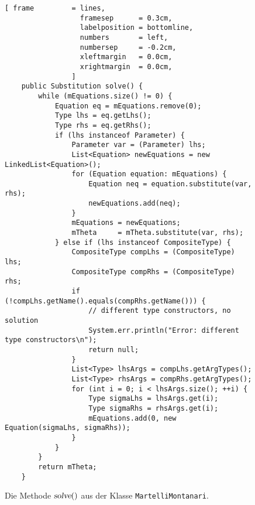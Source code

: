 \begin{figure}[!ht]
\centering
\begin{Verbatim}[ frame         = lines, 
                  framesep      = 0.3cm, 
                  labelposition = bottomline,
                  numbers       = left,
                  numbersep     = -0.2cm,
                  xleftmargin   = 0.0cm,
                  xrightmargin  = 0.0cm,
                ]
    public Substitution solve() {
        while (mEquations.size() != 0) {
            Equation eq = mEquations.remove(0);
            Type lhs = eq.getLhs();
            Type rhs = eq.getRhs();
            if (lhs instanceof Parameter) {
                Parameter var = (Parameter) lhs;
                List<Equation> newEquations = new LinkedList<Equation>();
                for (Equation equation: mEquations) {
                    Equation neq = equation.substitute(var, rhs);
                    newEquations.add(neq);
                }
                mEquations = newEquations;
                mTheta     = mTheta.substitute(var, rhs);
            } else if (lhs instanceof CompositeType) {
                CompositeType compLhs = (CompositeType) lhs;
                CompositeType compRhs = (CompositeType) rhs;
                if (!compLhs.getName().equals(compRhs.getName())) {
                    // different type constructors, no solution
                    System.err.println("Error: different type constructors\n");
                    return null;
                }
                List<Type> lhsArgs = compLhs.getArgTypes();
                List<Type> rhsArgs = compRhs.getArgTypes();
                for (int i = 0; i < lhsArgs.size(); ++i) {
                    Type sigmaLhs = lhsArgs.get(i);
                    Type sigmaRhs = rhsArgs.get(i);
                    mEquations.add(0, new Equation(sigmaLhs, sigmaRhs));
                }
            } 
        }
        return mTheta;
    }
\end{Verbatim}
\vspace*{-0.3cm}
\caption{Die Methode $\textsl{solve}()$ aus der Klasse \texttt{MartelliMontanari}.}
\label{fig:MartelliMontanari:solve.java}
\end{figure}

